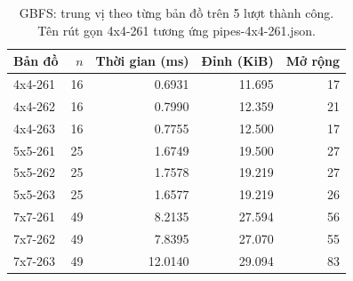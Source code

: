 
\begin{table}[H]\centering\small
\begin{tabular}{@{}lrrrr@{}}\toprule
Bản đồ & $n$ & Thời gian (ms) & Đỉnh (KiB) & Mở rộng\\\midrule
4x4-261 & 16 & 0.6931 & 11.695 & 17 \\
4x4-262 & 16 & 0.7990 & 12.359 & 21 \\
4x4-263 & 16 & 0.7755 & 12.500 & 17 \\
5x5-261 & 25 & 1.6749 & 19.500 & 27 \\
5x5-262 & 25 & 1.7578 & 19.219 & 27 \\
5x5-263 & 25 & 1.6577 & 19.219 & 26 \\
7x7-261 & 49 & 8.2135 & 27.594 & 56 \\
7x7-262 & 49 & 7.8395 & 27.070 & 55 \\
7x7-263 & 49 & 12.0140 & 29.094 & 83 \\
\bottomrule\end{tabular}
\caption{GBFS: trung vị theo từng bản đồ trên 5 lượt thành công. Tên rút gọn 4x4-261 tương ứng pipes-4x4-261.json.}
\end{table}
